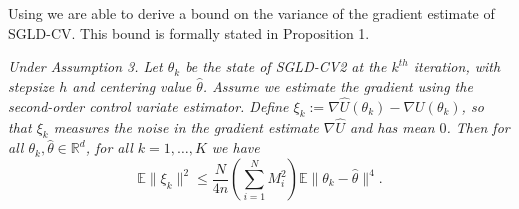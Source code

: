 Using  we are able to derive a bound on the variance of the gradient estimate of SGLD-CV. This bound is formally stated in Proposition 1.

\begin{proposition}\label{prop:quartic}
\textit{Under Assumption 3. Let $\theta_k$ be the state of SGLD-CV2 at the $k^{th}$ 
iteration, with stepsize $h$ and centering value $\hat\theta$. Assume we estimate 
the gradient using the second-order control variate estimator. Define $\xi_k := \nabla \hat{U}(\theta_k) - \nabla U(\theta_k)$, 
so that $\xi_k$ measures the noise in the gradient estimate $\nabla \hat{U}$ 
and has mean $0$. Then for all $\theta_k, \hat{\theta} \in \mathbb{R}^d$, for all 
$k = 1, \ldots, K$ we have}
\begin{equation}\label{eq:lemma1}
\mathbb{E}\|\xi_k\|^2 \leq \frac{N}{4n} \left( \sum_{i=1}^N M_i^2 \right) \mathbb{E}\|\theta_k - \hat\theta\|^4.
\end{equation}
\end{proposition}

